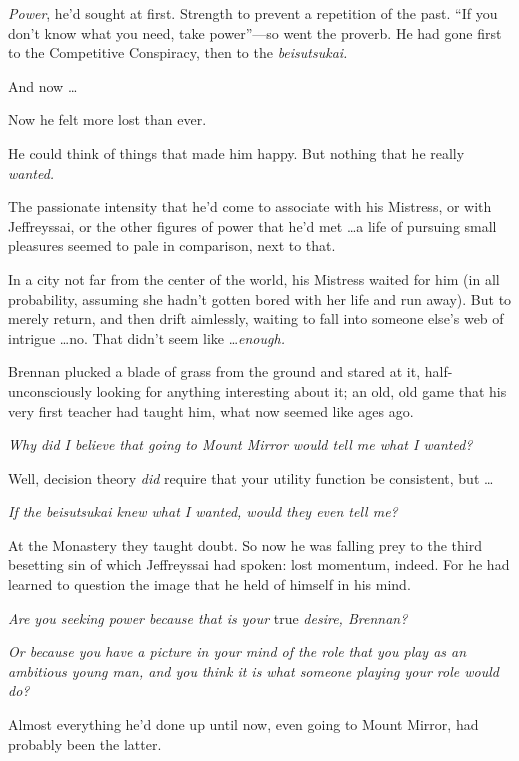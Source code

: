 {
 \textit{Power}, he'd sought at first. Strength to
prevent a repetition of the past. ``If you
don't know what you need, take
power''---so went the proverb. He had gone first to
the Competitive Conspiracy, then to the \textit{beisutsukai.}}

{
 And now \ldots}

{
 Now he felt more lost than ever.}

{
 He could think of things that made him happy. But nothing that he
really \textit{wanted.}}

{
 The passionate intensity that he'd come to
associate with his Mistress, or with Jeffreyssai, or the other figures
of power that he'd met \ldots a life of pursuing small
pleasures seemed to pale in comparison, next to that.}

{
 In a city not far from the center of the world, his Mistress
waited for him (in all probability, assuming she hadn't
gotten bored with her life and run away). But to merely return, and
then drift aimlessly, waiting to fall into someone
else's web of intrigue \ldots no. That
didn't seem like \ldots \textit{enough.}}

{
 Brennan plucked a blade of grass from the ground and stared at it,
half-unconsciously looking for anything interesting about it; an old,
old game that his very first teacher had taught him, what now seemed
like ages ago.}

{
 \textit{Why did I believe that going to Mount Mirror would tell me
what I wanted?}}

{
 Well, decision theory \textit{did} require that your utility
function be consistent, but \ldots}

{
 \textit{If the beisutsukai knew what I wanted, would they even
tell me?}}

{
 At the Monastery they taught doubt. So now he was falling prey to
the third besetting sin of which Jeffreyssai had spoken: lost momentum,
indeed. For he had learned to question the image that he held of
himself in his mind.}

{
 \textit{Are you seeking power because that is your} true
\textit{desire, Brennan?}}

{
 \textit{Or because you have a picture in your mind of the role}
\textit{that you play as an ambitious young man, and you think it is
what someone playing your role would do?}}

{
 Almost everything he'd done up until now, even
going to Mount Mirror, had probably been the latter.}

